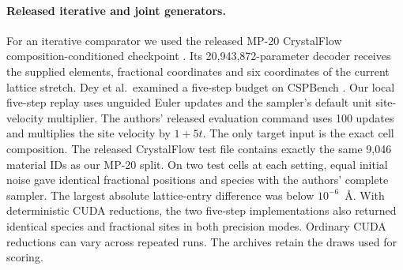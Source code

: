 \paragraph{Released iterative and joint generators.}
For an iterative comparator we used the released MP-20 CrystalFlow composition-conditioned checkpoint \cite{crystalflow}. Its 20,943,872-parameter decoder receives the supplied elements, fractional coordinates and six coordinates of the current lattice stretch. Dey et al.\ examined a five-step budget on CSPBench \cite{uflow}. Our local five-step replay uses unguided Euler updates and the sampler's default unit site-velocity multiplier. The authors' released evaluation command uses 100 updates and multiplies the site velocity by $1+5t$. The only target input is the exact cell composition. The released CrystalFlow test file contains exactly the same 9,046 material IDs as our MP-20 split.
On two test cells at each setting, equal initial noise gave identical fractional positions and species with the authors' complete sampler. The largest absolute lattice-entry difference was below $10^{-6}$~\AA.
With deterministic CUDA reductions, the two five-step implementations also returned identical species and fractional sites in both precision modes. Ordinary CUDA reductions can vary across repeated runs. The archives retain the draws used for scoring.

